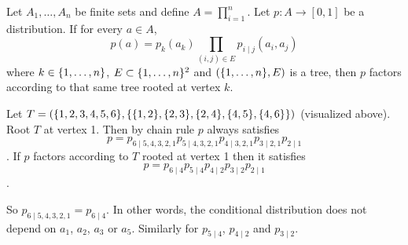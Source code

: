 
Let $A_1, \dots, A_n$ be finite sets and define $A = \prod_{i = 1}^{n}$.
Let $p: A \to [0, 1]$ be a distribution.
If for every $a \in A$, $$p(a) = p_k(a_k)\prod_{(i, j) \in E} p_{i \mid j}(a_i, a_j)$$ where $k \in \{1, \dots, n\}$, $E \subset \{1, \dots, n\}^2$ and $(\{1, \dots, n\}, E)$ is a tree, then $p$ factors according to that same tree rooted at vertex $k$.



Let $T = (\{1, 2, 3, 4, 5, 6\}, \{\{1, 2\}, \{2, 3\}, \{2, 4\}, \{4, 5\}, \{4, 6\}\})$ (visualized above). Root $T$ at vertex 1.
Then by chain rule $p$ always satisfies $$p = p_{6 \mid 5, 4, 3, 2, 1}p_{5 \mid 4, 3, 2, 1}p_{4 \mid 3, 2, 1} p_{3 \mid 2, 1}p_{2 \mid 1}$$.
If $p$ factors according to $T$ rooted at vertex 1 then it satisfies $$p = p_{6 \mid 4}p_{5 \mid 4}p_{4 \mid 2}p_{3 \mid 2}p_{2 \mid 1}$$.

So $p_{6 \mid 5, 4, 3, 2, 1} = p_{6 \mid 4}$. In other words, the conditional distribution does not depend on $a_1$, $a_2$, $a_3$ or $a_5$. Similarly for $p_{5 \mid 4}$, $p_{4 \mid 2}$ and $p_{3 \mid 2}$.

\strats
